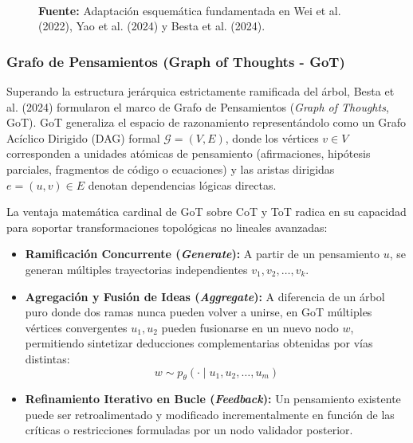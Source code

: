 \begin{figure}[htpb!]
\begin{tcolorbox}[colback=white, colframe=unmsm_gold, arc=3pt, boxrule=0.8pt, top=0.3cm, bottom=0.3cm, left=0.4cm, right=0.4cm]
{\begin{tikzpicture}[>=stealth, font=\scriptsize\sffamily]
\end{tikzpicture}%
}\\[0.25cm]
\raggedright
\scriptsize \textbf{Fuente:} Adaptación esquemática fundamentada en Wei et al. (2022), Yao et al. (2024) y Besta et al. (2024).
\end{tcolorbox}
\vspace{-0.2cm}
\end{figure}

\subsubsection{Grafo de Pensamientos (Graph of Thoughts - GoT)}

Superando la estructura jerárquica estrictamente ramificada del árbol, Besta et al. (2024) formularon el marco de Grafo de Pensamientos (\textit{Graph of Thoughts}, GoT). GoT generaliza el espacio de razonamiento representándolo como un Grafo Acíclico Dirigido (DAG) formal $\mathcal{G} = (V, E)$, donde los vértices $v \in V$ corresponden a unidades atómicas de pensamiento (afirmaciones, hipótesis parciales, fragmentos de código o ecuaciones) y las aristas dirigidas $e = (u, v) \in E$ denotan dependencias lógicas directas.

La ventaja matemática cardinal de GoT sobre CoT y ToT radica en su capacidad para soportar transformaciones topológicas no lineales avanzadas:

\begin{itemize}
    \item \textbf{Ramificación Concurrente (\textit{Generate}):} A partir de un pensamiento $u$, se generan múltiples trayectorias independientes $v_1, v_2, \dots, v_k$.
    \item \textbf{Agregación y Fusión de Ideas (\textit{Aggregate}):} A diferencia de un árbol puro donde dos ramas nunca pueden volver a unirse, en GoT múltiples vértices convergentes $u_1, u_2$ pueden fusionarse en un nuevo nodo $w$, permitiendo sintetizar deducciones complementarias obtenidas por vías distintas:
    \begin{equation}
    w \sim p_\theta(\cdot \mid u_1, u_2, \dots, u_m)
    \end{equation}
    \item \textbf{Refinamiento Iterativo en Bucle (\textit{Feedback}):} Un pensamiento existente puede ser retroalimentado y modificado incrementalmente en función de las críticas o restricciones formuladas por un nodo validador posterior.
\end{itemize}


